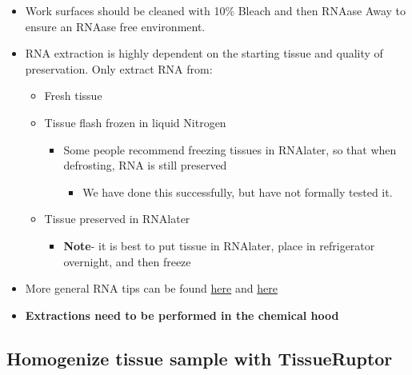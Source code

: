 \documentclass[
  letterpaper,
  DIV=11,
  numbers=noendperiod]{scrreprt}
\providecommand{\tightlist}{%
  \setlength{\itemsep}{0pt}\setlength{\parskip}{0pt}}\usepackage{longtable,booktabs,array}
\begin{document}

\begin{itemize}
\item
  Work surfaces should be cleaned with 10\% Bleach and then RNAase Away
  to ensure an RNAase free environment.
\item
  RNA extraction is highly dependent on the starting tissue and quality
  of preservation. Only extract RNA from:

  \begin{itemize}
  \item
    Fresh tissue
  \item
    Tissue flash frozen in liquid Nitrogen

    \begin{itemize}
    \item
      Some people recommend freezing tissues in RNAlater, so that when
      defrosting, RNA is still preserved

      \begin{itemize}
      \tightlist
      \item
        We have done this successfully, but have not formally tested it.
      \end{itemize}
    \end{itemize}
  \item
    Tissue preserved in RNAlater

    \begin{itemize}
    \tightlist
    \item
      \textbf{Note}- it is best to put tissue in RNAlater, place in
      refrigerator overnight, and then freeze
    \end{itemize}
  \end{itemize}
\item
  More general RNA tips can be found
  \href{https://www.thermofisher.com/us/en/home/references/ambion-tech-support/nuclease-enzymes/general-articles/working-with-rna.html}{here}
  and
  \href{https://www.thermofisher.com/us/en/home/references/ambion-tech-support/rna-isolation/general-articles/the-basics-rna-isolation.html}{here}
\item
  \textbf{Extractions need to be performed in the chemical hood}
\end{itemize}

\hypertarget{homogenize-tissue-sample-with-tissueruptor}{%
\subsection*{\texorpdfstring{\textbf{Homogenize tissue sample with
TissueRuptor}}{Homogenize tissue sample with TissueRuptor}}\label{homogenize-tissue-sample-with-tissueruptor}}
\end{document}
